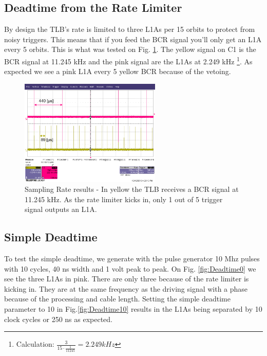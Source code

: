 \subsection{Deadtime from the Rate Limiter}

By design the TLB's rate is limited to three L1As per 15 orbits to protect from noisy triggers. This means that if you feed the BCR signal you'll only get an L1A every 5 orbits. This is what was tested on Fig. \ref{fig:SamplingRate}. The yellow signal on C1 is the BCR signal at 11.245 kHz and the pink signal are the L1As at 2.249 kHz \footnote{Calculation: $\frac{3}{15\cdot\frac{1}{11245}}=2.249 kHz$}. As expected we see a pink L1A every 5 yellow BCR because of the vetoing.

\begin{figure}[htbp!] 
\centering    
\includegraphics[width=0.6\textwidth]{SamplingRate.png}
\caption[Sampling Rate results]{Sampling Rate results - In yellow the TLB receives a BCR signal at 11.245 kHz. As the rate limiter kicks in, only 1 out of 5 trigger signal outputs an L1A.}
\label{fig:SamplingRate}
\end{figure}

\subsection{Simple Deadtime}

To test the simple deadtime, we generate with the pulse generator 10 Mhz pulses with 10 cycles, 40 ns width and 1 volt peak to peak. On Fig. \ref{fig:Deadtime0} we see the three L1As in pink. There are only three because of the rate limiter is kicking in. They are at the same frequency as the driving signal with a phase because of the processing and cable length. Setting the simple deadtime parameter to 10 in Fig.\ref{fig:Deadtime10} results in the L1As being separated by 10 clock cycles or 250 ns as expected.

